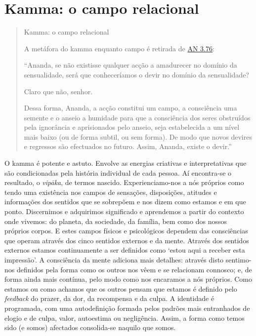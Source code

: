 \section{Kamma: o campo relacional}


\begin{quote}
  Kamma: o campo relacional

  A metáfora do kamma enquanto campo é retirada de \href{https://suttacentral.net/an3.76/en/thanissaro}{AN 3.76}:

  ``Ananda, se não existisse qualquer acção a amadurecer no domínio da sensualidade, será que conheceríamos o devir no domínio da sensualidade?

  Claro que não, senhor.

  Dessa forma, Ananda, a acção constitui um campo, a consciência uma semente e o anseio a humidade para que a consciência dos seres obstruídos pela ignorância e aprisionados pelo anseio, seja estabelecida a um nível mais baixo (ou de forma subtil, ou sem forma). De modo que novos devires e regressos são efectuados no futuro. Assim, Ananda, existe o devir.''
\end{quote}

O kamma é potente e astuto. Envolve as energias criativas e interpretativas que são condicionadas pela história individual de cada pessoa. Aí encontra-se o resultado, o \emph{vipāka}, de termos nascido. Experienciamo-nos a nós próprios como tendo uma existência nos campos de sensações, disposições, atitudes e informações dos sentidos que se sobrepõem e nos dizem como estamos e em que ponto. Discernimos e adquirimos significado e aprendemos a partir do contexto onde vivemos: do planeta, da sociedade, da família, bem como dos nossos próprios corpos. E estes campos físicos e psicológicos dependem das consciências que operam através dos cinco sentidos externos e da mente. Através dos sentidos externos estamos continuamente a ser definidos como `estou aqui a receber esta impressão'. A consciência da mente adiciona mais detalhes: através disto sentimo-nos definidos pela forma como os outros nos vêem e se relacionam connosco; e, de forma ainda mais contínua, pelo modo como nos encaramos a nós próprios. Como estamos ou como achamos que os outros pensam que estamos é definido pelo \emph{feedback} do prazer, da dor, da recompensa e da culpa. A identidade é programada, com uma autodefinição formada pelos padrões mais entranhados de elogio e de culpa, valor, autoestima ou negligência. Assim, a forma como temos sido (e somos) afectados consolida-se naquilo que somos.

